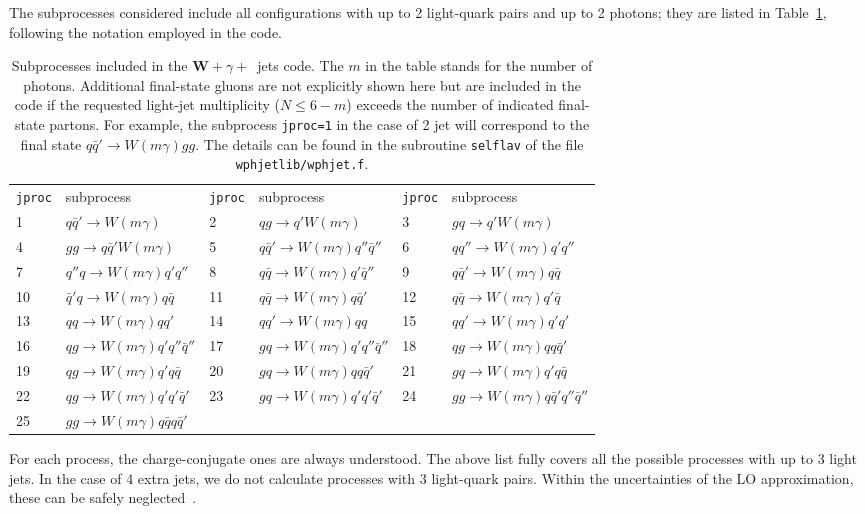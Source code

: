 \documentclass[paper]{JHEP3}
\newcommand{\ccaption}[2]{
    \begin{center}
    \parbox{0.85\textwidth}{
      \caption[#1]{\small{{#2}}}
      }
    \end{center}
    }
\def    \qbar   {\bar{q}}
\begin{document}
 The subprocesses considered include all configurations
with up to 2 light-quark pairs and up to 2 photons; they are listed in
Table~\ref{tab:wphjets}, following the notation employed in the
code.
\begin{table}
\begin{center}
\begin{tabular}{ll|ll|ll}
{\tt jproc} & subprocess & {\tt jproc} & subprocess & {\tt jproc} &
subprocess \\ 
1 &  $q\qbar' \to W(m\gamma)  $ 
&2 &  $q g \to q' W(m\gamma)  $ 
&3 &  $g q \to q' W(m\gamma)  $ 
\\
4 &  $gg \to q \qbar' W(m\gamma)  $ 
&5 &  $q\qbar' \to W(m\gamma)  q'' \qbar'' $ 
&6 &  $qq'' \to W(m\gamma)  q' q'' $ 
\\
7 &  $q'' q \to W(m\gamma)  q' q'' $ 
&8 &  $q\qbar \to W(m\gamma)  q' \qbar'' $ 
&9 &  $q\qbar' \to W(m\gamma)  q \qbar $ 
\\
10 &  $\qbar' q\to W(m\gamma)  q \qbar $ 
&11 &  $q\qbar \to W(m\gamma)  q \qbar' $ 
&12 &  $q\qbar \to W(m\gamma)  q' \qbar $ 
\\
13 &  $q q \to W(m\gamma)  q q' $ 
&14 &  $q q' \to W(m\gamma)  q q $ 
&15 &  $q q' \to W(m\gamma)  q' q' $ 
\\
16 &  $q g \to W(m\gamma)  q' q''\qbar'' $ 
&17 &  $g q \to W(m\gamma)  q' q''\qbar'' $ 
&18 &  $q g \to W(m\gamma)  q q \qbar' $ 
\\
19 &  $q g \to W(m\gamma)  q' q \qbar $ 
&20 &  $g q \to W(m\gamma)  q q \qbar' $ 
&21 &  $g q \to W(m\gamma)  q' q \qbar $ 
\\
22 &  $q g \to W(m\gamma) q' q' \qbar' $ 
&23 &  $g q \to W(m\gamma) q' q' \qbar' $ 
&24 &  $g g \to W(m\gamma) q \qbar' q'' \qbar'' $ 
\\
25 &  $g g \to W(m\gamma) q \qbar q \qbar' $ 
& &
& &
\end{tabular}
\ccaption{}{\label{tab:wphjets} Subprocesses included in the
  $\mathbf{W+}$$\gamma+$~jets
  code.  The $m$ in the table stands for the number of photons.  
  Additional final-state gluons are not explicitly 
  shown here but are included in the code if the requested light-jet
  multiplicity ($N\le 6-m$) exceeds the number of 
  indicated final-state partons.
  For example, the subprocess {\tt jproc=1} in the case of 2 jet
  will correspond to the final state  $q\qbar' \to W(m\gamma) g g$.
  The details can be found in the subroutine {\tt selflav} of
  the file {\tt wphjetlib/wphjet.f}.}
\end{center}
\end{table}
For each process, the charge-conjugate ones are always understood.
The above list fully covers all the possible processes with up to 3
light jets. In the case of 4 extra
jets, we do not calculate processes with 3 light-quark pairs. Within
the uncertainties of the LO approximation, these can be safely
neglected~\cite{Berends:1991ax}.
\end{document}
